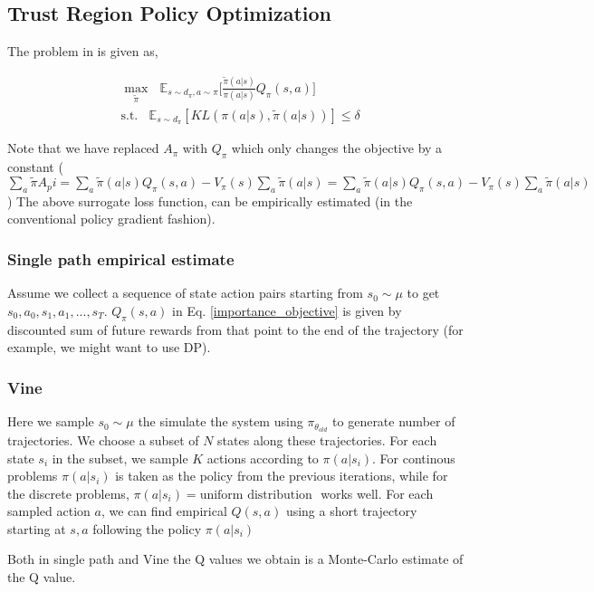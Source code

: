 \documentclass{article}[11pt]
\begin{document}
\subsection{Trust Region Policy Optimization}
The problem in \cite{schulman2015trust} is given as, 

\begin{align}
\label{importance_objective}
&\max_{\tilde{\pi}} \ \ \ \mathbb{E}_{s \sim d_{\pi},a \sim \pi} \Bigg[ \frac{\tilde{\pi}(a|s)}{\pi(a|s)} Q_{\pi}(s,a) \Bigg]\\
&\text{s.t.} \ \ \ \ \mathbb{E}_{s\sim d_\pi}[KL(\pi(a|s), \tilde{\pi}(a|s))] \le \delta
\end{align}

Note that we have replaced $A_\pi$ with $Q_\pi$ which only changes the objective by a constant ($\sum_a \tilde{\pi} A_pi = \sum_a \tilde{\pi}(a|s) Q_\pi(s,a) - V_\pi(s) \sum_a \tilde{\pi}(a|s)  = \sum_a \tilde{\pi}(a|s) Q_\pi(s,a) - V_\pi(s) \sum_a \tilde{\pi}(a|s)$)
The above surrogate loss function, can be empirically estimated (in the conventional policy gradient fashion). 

\subsubsection{Single path empirical estimate}
Assume we collect a sequence of state action pairs starting from $s_0 \sim \mu$ to get $s_0,a_0, s_1,a_1, ..., s_T$. $Q_\pi(s,a)$ in Eq. \ref{importance_objective} is given by discounted sum of future rewards from that point to the end of the trajectory (for example, we might want to use DP).

\subsubsection{Vine} 
Here we sample $s_0 \sim \mu$ the simulate the system using $\pi_{\theta_{old}}$ to generate number of trajectories. We choose a subset of $N$ states along these trajectories. For each state $s_i$ in the subset, we sample $K$ actions according to $\pi(a|s_i)$. For continous problems $\pi(a|s_i)$ is taken as the policy from the previous iterations, while for the discrete problems, $\pi(a|s_i) = \text{uniform distribution }$ works well. For each sampled action $a$, we can find empirical $Q(s,a)$ using a short trajectory starting at $s,a$ following the policy $\pi(a|s_i)$

Both in single path and Vine the Q values we obtain is a Monte-Carlo estimate of the Q value. 
\end{document}
